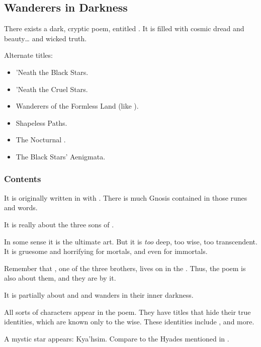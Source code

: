 \subsection{Wanderers in Darkness}
There exists a dark, cryptic poem, entitled \emph{}. 
It is filled with cosmic dread and beauty\ldots{} and wicked truth. 

Alternate titles:
\begin{itemize}
  \item 'Neath the Black Stars. 
  \item 'Neath the Cruel Stars. 
  \item Wanderers of the Formless Land (like ). 
  \item Shapeless Paths. 
  \item The Nocturnal . 
  \item The Black Stars' Aenigmata. 
\end{itemize}





\subsubsection{Contents}
It is originally written in  with . 
There is much Gnosis contained in those runes and words. 

It is really about the three sons of . 

In some sense it is the ultimate art. But it is \emph{too} deep, too wise, too transcendent. It is gruesome and horrifying for mortals, and even for immortals.

Remember that \Nexagglachel, one of the three brothers, lives on in the \satharioth. Thus, the poem is also about them, and they are  by it. 

It is partially about \Nexagglachel{} and  and wanders in their inner darkness.

All sorts of characters appear in the poem. They have titles that hide their true identities, which are known only to the wise. These identities include \Ishnaruchaefir, \Secherdamon{} and more. 

A mystic star appears: Kya'hsim. 
Compare to the Hyades mentioned in \RWCTKIY. 


